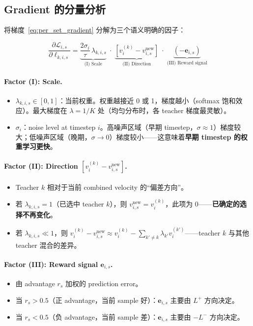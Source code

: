 \documentclass[11pt,a4paper]{article}
\newcommand{\loss}{\mathcal{L}}
\theoremstyle{definition}
\begin{document}
\subsection{Gradient 的分量分析}

将梯度~\eqref{eq:per_set_gradient} 分解为三个语义明确的因子：

\begin{equation}
\frac{\partial \loss_{i,s}}{\partial \ell_{k,i,s}} = \underbrace{\frac{2\sigma_i}{\tau}\,\lambda_{k,i,s}}_{\text{(I) Scale}} \;\cdot\;
\underbrace{\left[v^{(k)}_i - v^{\mathrm{new}}_{i,s}\right]}_{\text{(II) Direction}} \;\cdot\;
\underbrace{(-\mathbf{e}_{i,s})}_{\text{(III) Reward signal}}
\label{eq:grad_decomp}
\end{equation}

\paragraph{Factor (I): Scale.}
\begin{itemize}[leftmargin=1.5em]
\item $\lambda_{k,i,s} \in [0, 1]$：当前权重。权重越接近 0 或 1，梯度越小（softmax 饱和效应）。最大梯度在 $\lambda = 1/K$ 处（均匀分布时，各 teacher 梯度最灵敏）。
\item $\sigma_i$：noise level at timestep $i$。高噪声区域（早期 timestep，$\sigma \approx 1$）梯度较大；低噪声区域（晚期，$\sigma \to 0$）梯度较小——这意味着\textbf{早期 timestep 的权重学习更快}。
\end{itemize}

\paragraph{Factor (II): Direction $[v^{(k)}_i - v^{\mathrm{new}}_{i,s}]$.}
\begin{itemize}[leftmargin=1.5em]
\item Teacher $k$ 相对于当前 combined velocity 的``偏差方向''。
\item 若 $\lambda_{k,i,s} = 1$（已选中 teacher $k$），则 $v^{\mathrm{new}}_{i,s} = v^{(k)}_i$，此项为 0——\textbf{已确定的选择不再变化}。
\item 若 $\lambda_{k,i,s} \ll 1$，则 $v^{(k)}_i - v^{\mathrm{new}}_{i,s} \approx v^{(k)}_i - \sum_{k'\neq k}\lambda_{k'} v^{(k')}_i$——teacher $k$ 与其他 teacher 混合的差异。
\end{itemize}

\paragraph{Factor (III): Reward signal $\mathbf{e}_{i,s}$.}
\begin{itemize}[leftmargin=1.5em]
\item 由 advantage $r_s$ 加权的 prediction error。
\item 当 $r_s > 0.5$（正 advantage，当前 sample 好）：$\mathbf{e}_{i,s}$ 主要由 $L^+$ 方向决定。
\item 当 $r_s < 0.5$（负 advantage，当前 sample 差）：$\mathbf{e}_{i,s}$ 主要由 $-L^-$ 方向决定。
\end{itemize}
\end{document}
